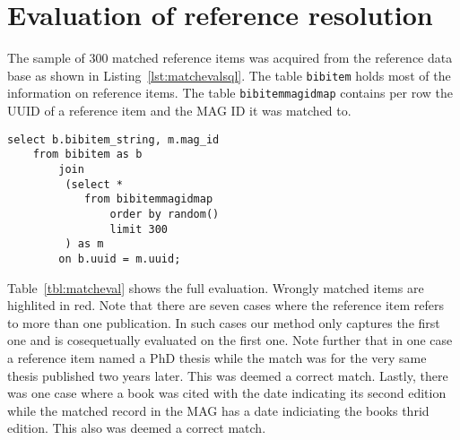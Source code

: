 \chapter{Evaluation of reference resolution}\label{chap:matcheval}

The sample of 300 matched reference items was acquired from the reference data base as shown in Listing~\ref{lst:matchevalsql}. The table \texttt{bibitem} holds most of the information on reference items. The table \texttt{bibitemmagidmap} contains per row the UUID of a reference item and the MAG ID it was matched to.

\begin{lstlisting}[caption={SQL query used to acquire the sample},label={lst:matchevalsql}]
select b.bibitem_string, m.mag_id
    from bibitem as b
        join
         (select *
            from bibitemmagidmap
                order by random()
                limit 300
         ) as m
        on b.uuid = m.uuid;
\end{lstlisting}

Table~\ref{tbl:matcheval} shows the full evaluation. Wrongly matched items are {\color{UniRed}highlited in red}. Note that there are seven cases where the reference item refers to more than one publication. In such cases our method only captures the first one and is cosequetually evaluated on the first one. Note further that in one case a reference item named a PhD thesis while the match was for the very same thesis published two years later. This was deemed a correct match. Lastly, there was one case where a book was cited with the date indicating its second edition while the matched record in the MAG has a date indiciating the books thrid edition. This also was deemed a correct match.
\newpage

